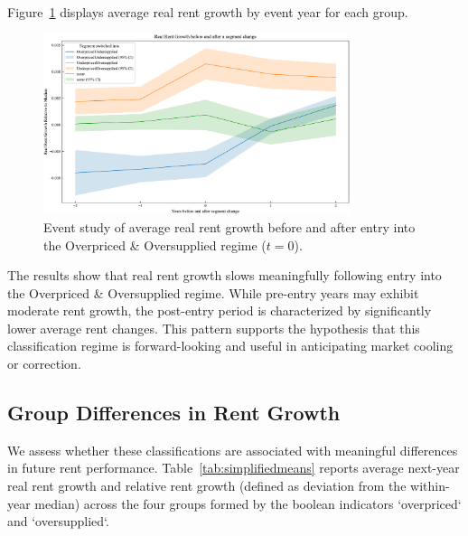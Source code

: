 \documentclass[APA,Times1COL]{WileyNJDv5} %
\begin{document}
Figure~\ref{fig:event_study} displays average real rent growth by event year for each group.

\begin{figure}[h]
	\centering
	\includegraphics[width=0.8\textwidth]{event_study.pdf}
	\caption*{Event study of average real rent growth before and after entry into the Overpriced \& Oversupplied regime ($t=0$).}
	\label{fig:event_study}
\end{figure}

The results show that real rent growth slows meaningfully following entry into the Overpriced \& Oversupplied regime. While pre-entry years may exhibit moderate rent growth, the post-entry period is characterized by significantly lower average rent changes. This pattern supports the hypothesis that this classification regime is forward-looking and useful in anticipating market cooling or correction.

\subsection{Group Differences in Rent Growth}

We assess whether these classifications are associated with meaningful differences in future rent performance. Table~\ref{tab:simplifiedmeans} reports average next-year real rent growth and relative rent growth (defined as deviation from the within-year median) across the four groups formed by the boolean indicators `overpriced` and `oversupplied`.
\end{document}
